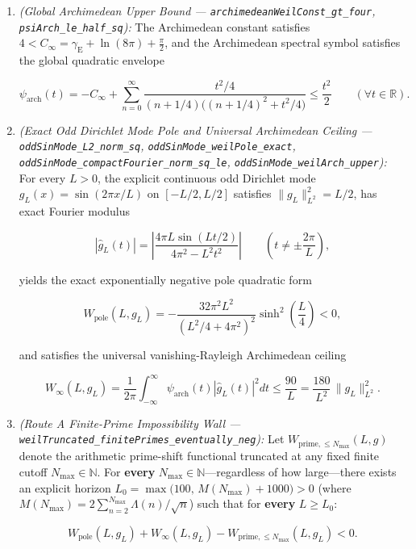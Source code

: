 \documentclass[
  11pt,
]{article}
\begin{document}
\begin{enumerate}
\def\labelenumi{\arabic{enumi}.}
\item
  \emph{(Global Archimedean Upper Bound ---
  \texttt{archimedeanWeilConst\_gt\_four},
  \texttt{psiArch\_le\_half\_sq}):} The Archimedean constant satisfies
  \(4 < C_\infty = \gamma_{\text{E}} + \ln(8\pi) + \frac{\pi}{2}\), and
  the Archimedean spectral symbol satisfies the global quadratic
  envelope

  \[\psi_{\text{arch}}(t) = -C_\infty + \sum_{n=0}^\infty \frac{t^2/4}{(n + 1/4)\big((n + 1/4)^2 + t^2/4\big)} \le \frac{t^2}{2} \qquad (\forall t \in \mathbb{R}).\]
\item
  \emph{(Exact Odd Dirichlet Mode Pole and Universal Archimedean Ceiling
  --- \texttt{oddSinMode\_L2\_norm\_sq},
  \texttt{oddSinMode\_weilPole\_exact},
  \texttt{oddSinMode\_compactFourier\_norm\_sq\_le},
  \texttt{oddSinMode\_weilArch\_upper}):} For every \(L > 0\), the
  explicit continuous odd Dirichlet mode \(g_L(x) = \sin(2\pi x / L)\)
  on \([-L/2, L/2]\) satisfies \(\|g_L\|_{L^2}^2 = L/2\), has exact
  Fourier modulus

  \[\left|\widehat{g}_L(t)\right| = \left|\frac{4\pi L \sin(Lt/2)}{4\pi^2 - L^2 t^2}\right| \qquad \left(t \neq \pm \frac{2\pi}{L}\right),\]

  yields the exact exponentially negative pole quadratic form

  \[W_{\text{pole}}(L, g_L) = -\frac{32\pi^2 L^2}{(L^2/4 + 4\pi^2)^2}\sinh^2\!\left(\frac{L}{4}\right) < 0,\]

  and satisfies the universal vanishing-Rayleigh Archimedean ceiling

  \[W_\infty(L, g_L) = \frac{1}{2\pi}\int_{-\infty}^{\infty} \psi_{\text{arch}}(t)\left|\widehat{g}_L(t)\right|^2 dt \le \frac{90}{L} = \frac{180}{L^2}\,\|g_L\|_{L^2}^2.\]
\item
  \emph{(Route A Finite-Prime Impossibility Wall ---
  \texttt{weilTruncated\_finitePrimes\_eventually\_neg}):} Let
  \(W_{\text{prime}, \le N_{\max}}(L, g)\) denote the arithmetic
  prime-shift functional truncated at any fixed finite cutoff
  \(N_{\max} \in \mathbb{N}\). For \textbf{every}
  \(N_{\max} \in \mathbb{N}\)---regardless of how large---there exists
  an explicit horizon
  \(L_0 = \max\!\big(100,\, M(N_{\max}) + 1000\big) > 0\) (where
  \(M(N_{\max}) = 2\sum_{n=2}^{N_{\max}} \Lambda(n)/\sqrt{n}\)) such
  that for \textbf{every} \(L \ge L_0\):

  \[W_{\text{pole}}(L, g_L) + W_\infty(L, g_L) - W_{\text{prime}, \le N_{\max}}(L, g_L) < 0.\]


\end{enumerate}
\end{document}
